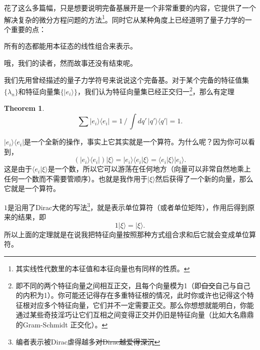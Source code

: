 \documentclass[12pt,a4paper,openany,twoside]{book}
\newtheorem{theorem}{Theorem}[section]
\numberwithin{equation}{section}
\newcommand{\bra}[1]{\langle #1 |}
\newcommand{\ket}[1]{| #1 \rangle}
\begin{document}
    花了这么多篇幅，只是想要说明完备基展开是一个非常重要的内容，它提供了一个解决复杂的微分方程问题的方法\footnote{其实线性代数里的本征值和本征向量也有同样的性质。}。同时它从某种角度上已经道明了量子力学的一个重要的点：
    \begin{center}
    	所有的态都能用本征态的线性组合来表示。
    \end{center}

    哦，我们的读者，然而故事还没有结束呢。

    我们先用曾经描述的量子力学符号来说说这个完备基。对于某个完备的特征值集$\{\lambda_n\}$和特征向量集$\{| e_i \rangle \}$，我们认为特征向量集已经正交归一\footnote{即不同的两个特征向量之间相互正交，且每个向量模为1（即\sout{自交}自己与自己的内积为1）。你可能还记得存在多重特征根的情况，此时你或许也记得这个特征根对应多个特征向量，它们并不一定需要正交。那么你想想就能明白，你能通过某些奇技淫巧让它们互相之间变得正交并仍旧是特征向量（比如大名鼎鼎的Gram-Schmidt 正交化）。}，那么有定理
    \begin{theorem}
	\begin{equation}
		\sum \ket{e_i}\bra{e_i} = 1 \, / \, \int dq' \, \ket{q'}\bra{q'} = 1.
	\end{equation}
    \end{theorem}

    $| e_i \rangle \langle e_i | $是一个全新的操作，事实上它其实就是一个算符。为什么呢？因为你可以看到，
    \begin{equation}
	    (| e_i \rangle \langle e_i | ) | \xi \rangle = | e_i \rangle \langle e_i | \xi \rangle = \langle e_i | \xi \rangle | e_i \rangle  .
    \end{equation}
    这是由于$ \langle e_i | \xi \rangle $是一个数，所以它可以游荡在任何地方（向量可以非常自然地乘上任何一个数而不需要管顺序）。也就是我作用于$| \xi \rangle $然后获得了一个新的向量，那么它就是一个算符。

    $1$是沿用了Dirac大佬的写法\footnote{编者表示被Dirac虐得越多\sout{对Dirac越爱得深沉}}，就是表示单位算符（或者单位矩阵），作用后得到原来的结果，即
    \begin{equation}
    	1 | \xi \rangle = | \xi \rangle .
    \end{equation}
    所以上面的定理就是在说我把特征向量按照那种方式组合求和后它就会变成单位算符。
\end{document}
